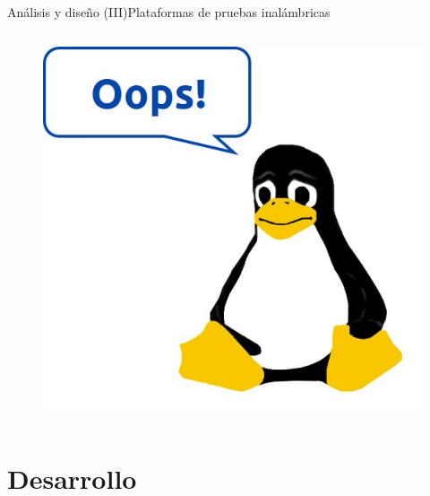 \documentclass[10pt,compress,xcolor=table]{beamer} %
\begin{document}
\begin{frame}{Análisis y diseño (III)}{Plataformas de pruebas inalámbricas}
\begin{columns}
  \begin{column}{0.1\textwidth}  %
      \begin{figure}
      \includegraphics[width=1.3\textwidth]{img/4.jpg}
      \end{figure}
  \end{column}
  
\end{columns}

\end{frame}


\section{Desarrollo}
\end{document}
